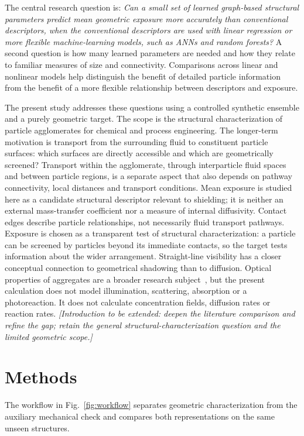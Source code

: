 \documentclass[11pt,a4paper]{article}
\newcommand{\pending}[1]{{\color{red}\textit{[#1]}}}
\begin{document}
The central research question is: \emph{Can a small set of learned graph-based structural parameters predict mean geometric exposure more accurately than conventional descriptors, when the conventional descriptors are used with linear regression or more flexible machine-learning models, such as ANNs and random forests?} A second question is how many learned parameters are needed and how they relate to familiar measures of size and connectivity. Comparisons across linear and nonlinear models help distinguish the benefit of detailed particle information from the benefit of a more flexible relationship between descriptors and exposure.

The present study addresses these questions using a controlled synthetic ensemble and a purely geometric target. The scope is the structural characterization of particle agglomerates for chemical and process engineering. The longer-term motivation is transport from the surrounding fluid to constituent particle surfaces: which surfaces are directly accessible and which are geometrically screened? Transport within the agglomerate, through interparticle fluid spaces and between particle regions, is a separate aspect that also depends on pathway connectivity, local distances and transport conditions. Mean exposure is studied here as a candidate structural descriptor relevant to shielding; it is neither an external mass-transfer coefficient nor a measure of internal diffusivity. Contact edges describe particle relationships, not necessarily fluid transport pathways. Exposure is chosen as a transparent test of structural characterization: a particle can be screened by particles beyond its immediate contacts, so the target tests information about the wider arrangement. Straight-line visibility has a closer conceptual connection to geometrical shadowing than to diffusion. Optical properties of aggregates are a broader research subject~\cite{Sorensen2001}, but the present calculation does not model illumination, scattering, absorption or a photoreaction. It does not calculate concentration fields, diffusion rates or reaction rates. \pending{Introduction to be extended: deepen the literature comparison and refine the gap; retain the general structural-characterization question and the limited geometric scope.}

\section{Methods}
The workflow in Fig.~\ref{fig:workflow} separates geometric characterization from the auxiliary mechanical check and compares both representations on the same unseen structures.

\end{document}
